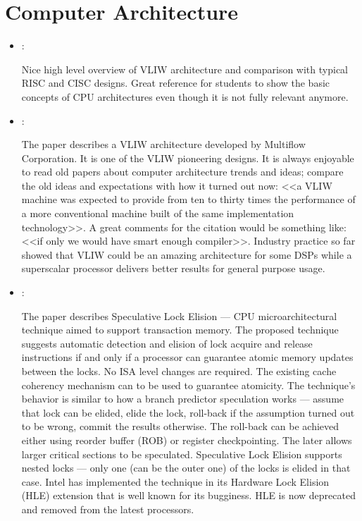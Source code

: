 \section*{Computer Architecture}
\begin{itemize}
    \item \cite{Philips:VLIW:1997}:

    Nice high level overview of VLIW architecture and comparison with typical RISC and CISC designs. Great reference for students to show the basic concepts of CPU architectures even though it is not fully relevant anymore.

    \item \cite{Colwell:Multiflow-VLIW:1987}:

    The paper describes a VLIW architecture developed by Multiflow Corporation. It is one of the VLIW pioneering designs. It is always enjoyable to read old papers about computer architecture trends and ideas; compare the old ideas and expectations with how it turned out now: <<a VLIW machine was expected to provide from ten to thirty times the performance of a more conventional machine built of the same implementation technology>>. A great comments for the citation would be something like: <<if only we would have smart enough compiler>>. Industry practice so far showed that VLIW could be an amazing architecture for some DSPs while a superscalar processor delivers better results for general purpose usage.

    \item \cite{Rajwar:SpeculativeLockElision:2001}:

    The paper describes Speculative Lock Elision --- CPU microarchitectural technique aimed to support transaction memory. The proposed technique suggests automatic detection and elision of lock acquire and release instructions if and only if a processor can guarantee atomic memory updates between the locks. No ISA level changes are required. The existing cache coherency mechanism can to be used to guarantee atomicity. The technique's behavior is similar to how a branch predictor speculation works --- assume that lock can be elided, elide the lock, roll-back if the assumption turned out to be wrong, commit the results otherwise. The roll-back can be achieved either using reorder buffer (ROB) or register checkpointing. The later allows larger critical sections to be speculated. Speculative Lock Elision supports nested locks --- only one (can be the outer one) of the locks is elided in that case. Intel has implemented the technique in its Hardware Lock Elision (HLE) extension that is well known for its bugginess. HLE is now deprecated and removed from the latest processors.
\end{itemize}

